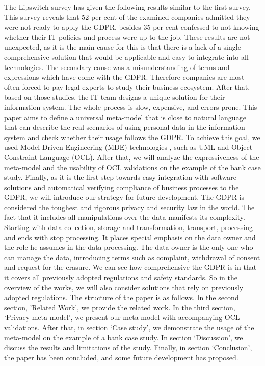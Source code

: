 \documentclass[11pt,english]{article}
\begin{document}
\quad The Lipswitch survey \cite{lipswitch} has given the following results similar to the first survey. This survey reveals that 52 per cent of the examined companies admitted they were not ready to apply the GDPR, besides 35 per cent confessed to not knowing whether their IT policies and process were up to the job. These results are not unexpected, as it is the main cause for this is that there is a lack of a single comprehensive solution that would be applicable and easy to integrate into all technologies. The secondary cause was a misunderstanding of terms and expressions which have come with the GDPR. Therefore companies are most often forced to pay legal experts to study their business ecosystem. After that, based on those studies, the IT team designs a unique solution for their information system. The whole process is slow, expensive, and errors prone. \newline This paper aims to define a universal meta-model that is close to natural language that can describe the real scenarios of using personal data in the information system and check whether their usage follows the GDPR. To achieve this goal, we used Model-Driven Engineering (MDE) technologies \cite{mde}, such as UML \cite{uml} and Object Constraint Language (OCL). After that, we will analyze the expressiveness of the meta-model and the usability of OCL validations on the example of the bank case study. Finally, as it is the first step towards easy integration with software solutions and automatical verifying compliance of business processes to the GDPR, we will introduce our strategy for future development. \newline The GDPR is considered the toughest and rigorous privacy and security law in the world.  The fact that it includes all manipulations over the data manifests its complexity. Starting with data collection, storage and transformation, transport, processing and ends with stop processing. It places special emphasis on the data owner and the role he assumes in the data processing. The data owner is the only one who can manage the data, introducing terms such as complaint, withdrawal of consent and request for the erasure. We can see how comprehensive the GDPR is in that it covers all previously adopted regulations and safety standards. So in the overview of the works, we will also consider solutions that rely on previously adopted regulations. \newline The structure of the paper is as follows. In the second section, 'Related Work', we provide the related work. In the third section, ‘Privacy meta-model’, we present our meta-model with accompanying OCL validations. After that, in section ‘Case study’, we demonstrate the usage of the meta-model on the example of a bank case study. In section ‘Discussion’,  we discuss the results and limitations of the study. Finally, in section ‘Conclusion’, the paper has been concluded, and some future development has proposed.
\end{document}
